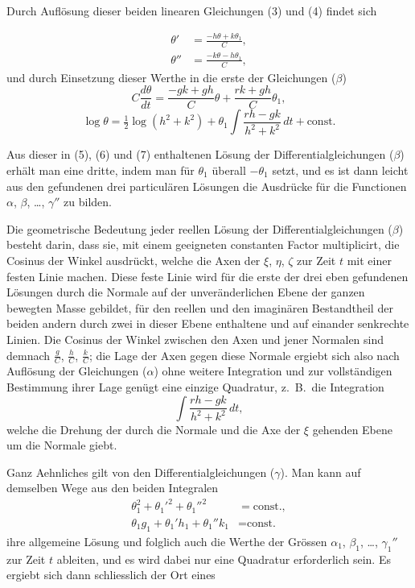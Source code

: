 \documentclass[12pt,a4paper]{article}
\begin{document}
Durch Aufl\"osung dieser beiden linearen Gleichungen (3) und (4) findet sich

\begin{align*}
\theta' &= \frac{-h\theta + k\theta_{1}}{C},\tag{5}\\
\theta'' &= \frac{-k\theta - h\theta_{1}}{C},\tag{6}
\end{align*}
und durch Einsetzung dieser Werthe in die erste der Gleichungen ($\beta$)
\[
C\frac{d\theta}{dt} = \frac{-gk + gh}{C}\theta + \frac{rk + gh}{C}\theta_{1},
\]
\begin{equation*}
\log\theta = \tfrac{1}{2}\log(h^{2} + k^{2}) + \theta_{1}\int\frac{rh - gk}{h^{2} + k^{2}}\,dt + \text{const.}\tag{7}
\end{equation*}

Aus dieser in (5), (6) und (7) enthaltenen L\"osung der Differentialgleichungen ($\beta$) erh\"alt man eine dritte, indem man f\"ur $\theta_{1}$ \"uberall $-\theta_{1}$ setzt, und es ist dann leicht aus den gefundenen drei particul\"aren L\"osungen die Ausdr\"ucke f\"ur die Functionen $\alpha$, $\beta$, \dots, $\gamma''$ zu bilden.

Die geometrische Bedeutung jeder reellen L\"osung der Differentialgleichungen ($\beta$) besteht darin, dass sie, mit einem geeigneten constanten Factor multiplicirt, die Cosinus der Winkel ausdr\"uckt, welche die Axen der $\xi$, $\eta$, $\zeta$ zur Zeit $t$ mit einer festen Linie machen. Diese feste Linie wird f\"ur die erste der drei eben gefundenen L\"osungen durch die Normale auf der unver\"anderlichen Ebene der ganzen bewegten Masse gebildet, f\"ur den reellen und den imagin\"aren Bestandtheil der beiden andern durch zwei in dieser Ebene enthaltene und auf einander senkrechte Linien. Die Cosinus der Winkel zwischen den Axen und jener Normalen sind demnach $\frac{g}{C}$, $\frac{h}{C}$, $\frac{k}{C}$; die Lage der Axen gegen diese Normale ergiebt sich also nach Aufl\"osung der Gleichungen ($\alpha$) ohne weitere Integration und zur vollst\"andigen Bestimmung ihrer Lage gen\"ugt eine einzige Quadratur, z.~B.~die Integration
\begin{equation*}
\int\frac{rh - gk}{h^{2} + k^{2}}\,dt,\tag{$\delta$}
\end{equation*}
welche die Drehung der durch die Normale und die Axe der $\xi$ gehenden Ebene um die Normale giebt.

Ganz Aehnliches gilt von den Differentialgleichungen ($\gamma$). Man kann auf demselben Wege aus den beiden Integralen
\begin{align*}
\theta_{1}^{2} + \theta_{1}'^{2} + \theta_{1}''^{2} &= \text{const.},\tag{VI}\\
\theta_{1}g_{1} + \theta_{1}'h_{1} + \theta_{1}''k_{1} &= \text{const.}\tag{VII}
\end{align*}
ihre allgemeine L\"osung und folglich auch die Werthe der Gr\"ossen $\alpha_{1}$, $\beta_{1}$, \dots, $\gamma_{1}''$ zur Zeit $t$ ableiten, und es wird dabei nur eine Quadratur erforderlich sein. Es ergiebt sich dann schliesslich der Ort eines
\end{document}
